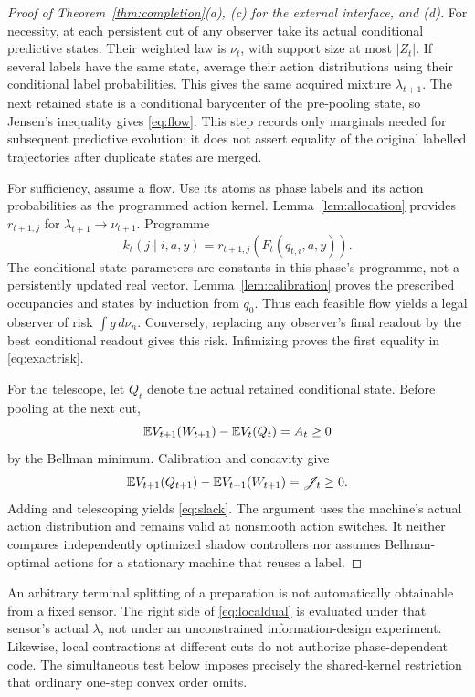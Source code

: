 \begin{proof}[Proof of Theorem~\ref{thm:completion}(a), (c) for the external interface, and (d)]
For necessity, at each persistent cut of any observer take its actual conditional predictive states. Their weighted law is $\nu_t$, with support size at most $|Z_t|$. If several labels have the same state, average their action distributions using their conditional label probabilities. This gives the same acquired mixture $\lambda_{t+1}$. The next retained state is a conditional barycenter of the pre-pooling state, so Jensen's inequality gives \eqref{eq:flow}. This step records only marginals needed for subsequent predictive evolution; it does not assert equality of the original labelled trajectories after duplicate states are merged.

For sufficiency, assume a flow. Use its atoms as phase labels and its action probabilities as the programmed action kernel. Lemma~\ref{lem:allocation} provides $r_{t+1,j}$ for $\lambda_{t+1}\to\nu_{t+1}$. Programme
\[
 k_t(j\mid i,a,y)=r_{t+1,j}(F_t(q_{t,i},a,y)).
\]
The conditional-state parameters are constants in this phase's programme, not a persistently updated real vector. Lemma~\ref{lem:calibration} proves the prescribed occupancies and states by induction from $q_0$. Thus each feasible flow yields a legal observer of risk $\int g\,d\nu_n$. Conversely, replacing any observer's final readout by the best conditional readout gives this risk. Infimizing proves the first equality in \eqref{eq:exactrisk}.

For the telescope, let $Q_t$ denote the actual retained conditional state. Before pooling at the next cut,
\[
 \mathbb E V_{t+1}(W_{t+1})-\mathbb E V_t(Q_t)=A_t\ge0
\]
by the Bellman minimum. Calibration and concavity give
\[
 \mathbb E V_{t+1}(Q_{t+1})-\mathbb E V_{t+1}(W_{t+1})=\mathscr J_t\ge0.
\]
Adding and telescoping yields \eqref{eq:slack}. The argument uses the machine's actual action distribution and remains valid at nonsmooth action switches. It neither compares independently optimized shadow controllers nor assumes Bellman-optimal actions for a stationary machine that reuses a label.
\end{proof}

\begin{remark}\label{rem:dual}
An arbitrary terminal splitting of a preparation is not automatically obtainable from a fixed sensor. The right side of \eqref{eq:localdual} is evaluated under that sensor's actual $\lambda$, not under an unconstrained information-design experiment. Likewise, local contractions at different cuts do not authorize phase-dependent code. The simultaneous test below imposes precisely the shared-kernel restriction that ordinary one-step convex order omits.
\end{remark}


